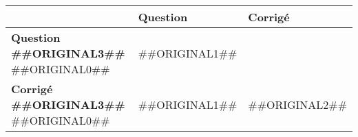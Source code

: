 \documentclass[a4paper,11pt]{article}
\begin{document}
\begin{longtable}{|p{6cm}|p{6cm}|p{6cm}|}
\hline 
  & Question & Corrigé \\



\hline 
\textbf{Question ##{{ORIGINAL3}}##} \newline ##{{ORIGINAL0}}## & ##{{ORIGINAL1}}## &  \\




\hline 
\textbf{Corrigé ##{{ORIGINAL3}}##} \newline ##{{ORIGINAL0}}## & ##{{ORIGINAL1}}## & ##{{ORIGINAL2}}## \\




\hline 
\end{longtable} 
\end{document}
